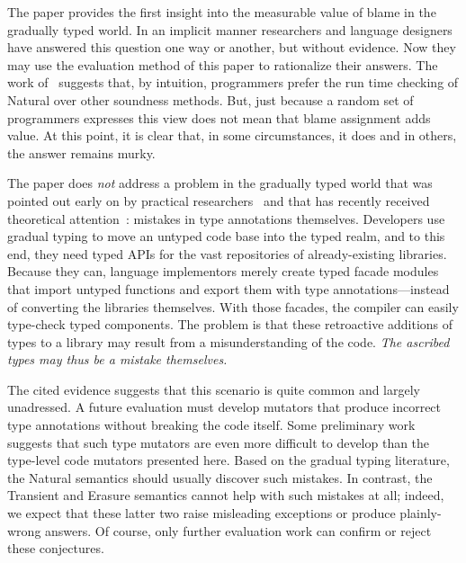 
The paper provides the first insight into the measurable value of blame in the
gradually typed world. In an implicit manner researchers and language designers
have answered this question one way or another, but without evidence. Now they
may use the evaluation method of this paper to rationalize their answers.  The
work of~\citet{tgpk-dls-2018} suggests that, by intuition, programmers prefer
the run time checking of Natural over other soundness methods. But, just because
a random set of programmers expresses this view does not mean that blame
assignment adds value. At this point, it is clear that, in some circumstances,
it does and in others, the answer remains murky.

The paper does {\em not\/} address a problem in the gradually typed world that
was pointed out early on by practical researchers~\cite{incorrect-ts,
sta-nt-base-types, wmwz-ecoop-2017} and that has recently received theoretical
attention~\cite{gfd-oopsla-2019, cc-oopsla-20}: mistakes in type annotations
themselves.  Developers use gradual typing to move an untyped code base into the
typed realm, and to this end, they need typed APIs for the vast repositories of
already-existing libraries. Because they can, language implementors merely
create typed facade modules that import untyped functions and export them with
type annotations---instead of converting the libraries themselves. With those
facades, the compiler can easily type-check typed components. The problem is
that these retroactive additions of types to a library may result from a
misunderstanding of the code. \emph{The ascribed types may thus be a mistake
themselves.}

The cited evidence suggests that this scenario is quite common and largely
unadressed.  A future evaluation must develop mutators that produce incorrect
type annotations without breaking the code itself. Some preliminary work
suggests that such type mutators are even more difficult to develop than the
type-level code mutators presented here. Based on the gradual typing literature,
the Natural semantics should usually discover such mistakes. In contrast, the
Transient and Erasure semantics cannot help with such mistakes at all; indeed,
we expect that these latter two raise misleading exceptions or produce
plainly-wrong answers.  Of course, only further evaluation work can confirm or
reject these conjectures.



